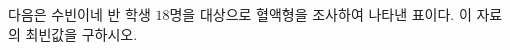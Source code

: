 다음은 수빈이네 반 학생 $18$명을 대상으로 혈액형을 조사하여 나타낸 표이다. 이 자료의 최빈값을 구하시오.
\par\smallskip\begin{center}\resizebox{\ifdim\width>\linewidth\linewidth\else\width\fi}{!}{}\end{center}
